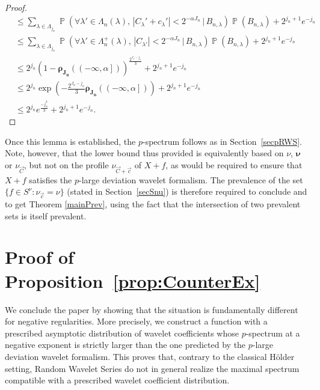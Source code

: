 \documentclass[a4paper,11pt,oneside]{article}
\DeclareMathOperator{\prob}{\mathbb{P}}
\newcommand{\ocint}[1]{\left({#1}\right]}
\newcommand{\modu}[1]{\left\vert{#1}\right\vert}
\theoremstyle{definition}
\theoremstyle{plain}
\begin{document}
\begin{proof}
\begin{align*}
& \leq \sum_{\lambda\in\Lambda_{j_n}}\prob\left(\forall \lambda'\in\Lambda_n(\lambda),\,\modu{C_\lambda'+c_\lambda'}<2^{-\alpha J_n}\,|\,B_{n,\lambda}\right)\prob(B_{n,\lambda})+2^{j_n+1}e^{-j_n} \\
& \leq \sum_{\lambda\in\Lambda_{j_n}}\prob\left(\forall \lambda'\in\Lambda_n^+(\lambda),\,\modu{C_{\lambda'}}<2^{-\alpha J_n}\,|\,B_{n,\lambda}\right)\prob(B_{n,\lambda})+2^{j_n+1}e^{-j_n} \\
& \leq 2^{j_n}\left(1-\bm{\rho_{J_n}}(\ocint{-\infty,\alpha})\right)^{\frac{2^{J_n-j_n}}{3}}+2^{j_n+1}e^{-j_n} \\
& \leq 2^{j_n}\exp\left(-\frac{2^{J_n-j_n}}{3}\bm{\rho_{J_n}}(\ocint{-\infty,\alpha})\right)+2^{j_n+1}e^{-j_n} \\
& \leq 2^{j_n}e^{\frac{-j_n^2}{3}}+2^{j_n+1}e^{-j_n}.
\end{align*}
\end{proof}


Once this lemma is established, the $p$-spectrum follows as in Section~\ref{secpRWS}. Note, however, that the lower bound thus provided is equivalently based on $\nu$, $\bm{\nu}$ or $\nu_{\vec{C}}$, but not on the profile $\nu_{\vec{C}+\vec{c}}$ of $X+f$, as would be required to ensure that $X+f$ satisfies the $p$-large deviation wavelet formalism. The prevalence of the set $\{f\in S^\nu:\nu_{\vec{c}}=\nu\}$ (stated in Section~\ref{secSnu}) is therefore required to conclude 
and to get Theorem \ref{mainPrev}, using the fact that the intersection of two prevalent sets is itself prevalent.



\section{Proof of Proposition~\ref{prop:CounterEx}}\label{secCounterEx}

We conclude the paper by showing that the situation is fundamentally different for negative regularities. More precisely, we construct a function with a prescribed asymptotic distribution of wavelet coefficients whose $p$-spectrum at a negative exponent is strictly larger than the one predicted by the $p$-large deviation wavelet formalism. This proves that, contrary to the classical H\"older setting, Random Wavelet Series do not in general realize the maximal spectrum compatible with a prescribed wavelet coefficient distribution.
\end{document}
